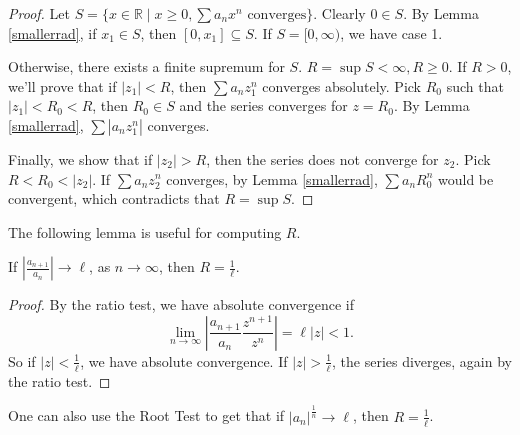 \begin{proof}
    Let \(S = \{x \in \mathbb{R}\mid x \geq 0, \sum a_n x^n\text{ converges}\}\). Clearly \(0 \in S\). By Lemma \eqref{smallerrad}, if \(x_1 \in S\), then \([0, x_1] \subseteq S\). If \(S = [0, \infty)\), we have case 1.

    Otherwise, there exists a finite supremum for \(S\). \(R = \sup S < \infty, R \geq 0\). If \(R > 0\), we'll prove that if \(\left\vert z_1 \right\vert < R\), then \(\sum a_n z_1^n\) converges absolutely. Pick \(R_0\) such that \(\left\vert z_1 \right\vert < R_0 < R\), then \(R_0 \in S\) and the series converges for \(z = R_0\). By Lemma \eqref{smallerrad}, \(\sum \left\vert a_{n}z_1^n \right\vert\) converges.

    Finally, we show that if \(\left\vert z_2 \right\vert > R\), then the series does not converge for \(z_2\). Pick \(R < R_0 < \left\vert z_2 \right\vert \). If \(\sum a_n z_2^n\) converges, by Lemma \eqref{smallerrad}, \(\sum a_n R_0^n\) would be convergent, which contradicts that \(R = \sup S\).
\end{proof}
The following lemma is useful for computing \(R\).
\begin{lemma}
    If \(\left\vert \frac{a_{n+1}}{a_n} \right\vert\to \ell \), as \(n \to \infty\), then \(R = \frac{1}{\ell}\).
\end{lemma}
\begin{proof}
    By the ratio test, we have absolute convergence if
    \[
        \lim\limits_{n \to \infty} \left\vert \frac{a_{n+1}}{a_n}\frac{z^{n+1}}{z^n} \right\vert = \ell \left\vert z \right\vert < 1.
    \]
    So if \(\left\vert z \right\vert < \frac{1}{\ell}\), we have absolute convergence. If \(\left\vert z \right\vert > \frac{1}{\ell}\), the series diverges, again by the ratio test.
\end{proof}
\begin{remark}
    One can also use the Root Test to get that if \(\left\vert a_n \right\vert^{\frac{1}{n}} \to \ell\), then \(R = \frac{1}{\ell}\).
\end{remark}
